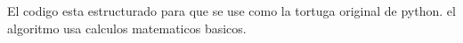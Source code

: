 El codigo esta estructurado para que se use como la tortuga original de python. el algoritmo usa calculos matematicos basicos. 